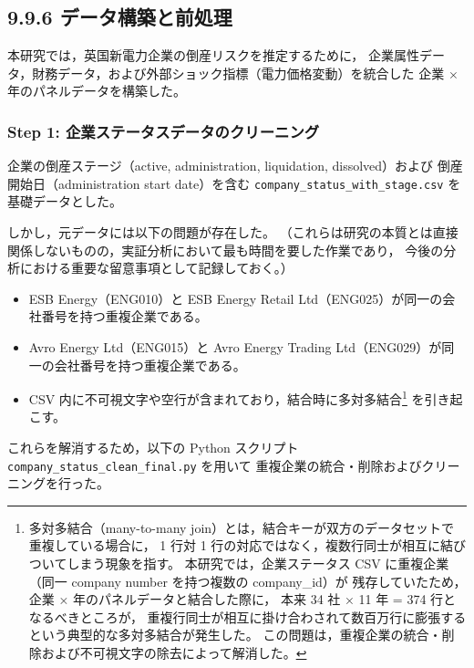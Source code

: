 
\subsection*{9.9.6 データ構築と前処理}

本研究では，英国新電力企業の倒産リスクを推定するために，
企業属性データ，財務データ，および外部ショック指標（電力価格変動）を統合した
企業 $\times$ 年のパネルデータを構築した。

\subsubsection*{Step 1: 企業ステータスデータのクリーニング}

企業の倒産ステージ（active, administration, liquidation, dissolved）および
倒産開始日（administration start date）を含む
\texttt{company\_status\_with\_stage.csv} を基礎データとした。

しかし，元データには以下の問題が存在した。
（これらは研究の本質とは直接関係しないものの，実証分析において最も時間を要した作業であり，
今後の分析における重要な留意事項として記録しておく。）

\begin{itemize}
  \item ESB Energy（ENG010）と ESB Energy Retail Ltd（ENG025）が同一の会社番号を持つ重複企業である。
  \item Avro Energy Ltd（ENG015）と Avro Energy Trading Ltd（ENG029）が同一の会社番号を持つ重複企業である。
  \item CSV 内に不可視文字や空行が含まれており，結合時に多対多結合\footnote{
多対多結合（many-to-many join）とは，結合キーが双方のデータセットで重複している場合に，
1 行対 1 行の対応ではなく，複数行同士が相互に結びついてしまう現象を指す。
本研究では，企業ステータス CSV に重複企業（同一 company number を持つ複数の company\_id）が
残存していたため，企業 × 年のパネルデータと結合した際に，
本来 34 社 × 11 年 = 374 行となるべきところが，
重複行同士が相互に掛け合わされて数百万行に膨張するという典型的な多対多結合が発生した。
この問題は，重複企業の統合・削除および不可視文字の除去によって解消した。
} を引き起こす。
\end{itemize}


これらを解消するため，以下の Python スクリプト
\texttt{company\_status\_clean\_final.py} を用いて
重複企業の統合・削除およびクリーニングを行った。

